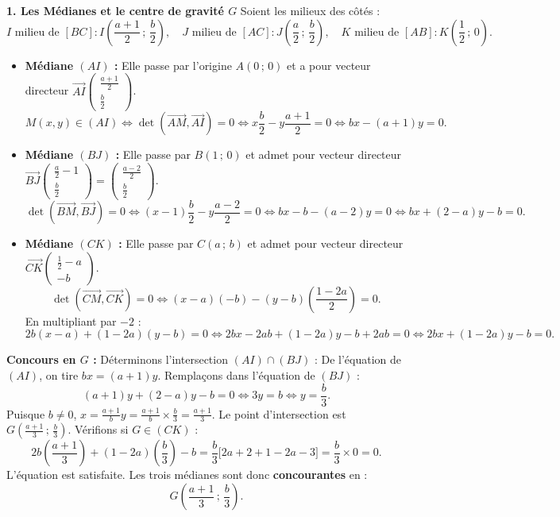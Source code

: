 \documentclass[11pt,a4paper]{article}
\newcommand{\vect}[1]{\overrightarrow{#1}}
\renewcommand{\det}{\operatorname{det}}
\begin{document}
\begin{correctionbox}
\textbf{1. Les Médianes et le centre de gravité $G$}
Soient les milieux des côtés :
\[
I \text{ milieu de } [BC] : I\left(\frac{a + 1}{2} \,;\, \frac{b}{2}\right), \quad
J \text{ milieu de } [AC] : J\left(\frac{a}{2} \,;\, \frac{b}{2}\right), \quad
K \text{ milieu de } [AB] : K\left(\frac{1}{2} \,;\, 0\right).
\]
\begin{itemize}[leftmargin=1cm]
    \item \textbf{Médiane $(AI)$ :} Elle passe par l'origine $A(0\,;\,0)$ et a pour vecteur directeur $\vect{AI}\begin{pmatrix} \frac{a+1}{2} \\ \frac{b}{2} \end{pmatrix}$.
    \[
    M(x, y) \in (AI) \iff \det(\vect{AM}, \vect{AI}) = 0 \iff x \frac{b}{2} - y \frac{a+1}{2} = 0 \iff bx - (a + 1)y = 0.
    \]
    \item \textbf{Médiane $(BJ)$ :} Elle passe par $B(1\,;\,0)$ et admet pour vecteur directeur $\vect{BJ}\begin{pmatrix} \frac{a}{2} - 1 \\ \frac{b}{2} \end{pmatrix} = \begin{pmatrix} \frac{a-2}{2} \\ \frac{b}{2} \end{pmatrix}$.
    \[
    \det(\vect{BM}, \vect{BJ}) = 0 \iff (x - 1)\frac{b}{2} - y \frac{a - 2}{2} = 0 \iff bx - b - (a - 2)y = 0 \iff bx + (2 - a)y - b = 0.
    \]
    \item \textbf{Médiane $(CK)$ :} Elle passe par $C(a\,;\,b)$ et admet pour vecteur directeur $\vect{CK}\begin{pmatrix} \frac{1}{2} - a \\ -b \end{pmatrix}$.
    \[
    \det(\vect{CM}, \vect{CK}) = 0 \iff (x - a)(-b) - (y - b)\left(\frac{1 - 2a}{2}\right) = 0.
    \]
    En multipliant par $-2$ :
    \[
    2b(x - a) + (1 - 2a)(y - b) = 0 \iff 2bx - 2ab + (1 - 2a)y - b + 2ab = 0 \iff 2bx + (1 - 2a)y - b = 0.
    \]
\end{itemize}
\textbf{Concours en $G$ :} Déterminons l'intersection $(AI) \cap (BJ)$ :
De l'équation de $(AI)$, on tire $bx = (a + 1)y$. Remplaçons dans l'équation de $(BJ)$ :
\[
(a + 1)y + (2 - a)y - b = 0 \iff 3y = b \iff y = \frac{b}{3}.
\]
Puisque $b \neq 0$, $x = \frac{a + 1}{b} y = \frac{a + 1}{b} \times \frac{b}{3} = \frac{a + 1}{3}$.
Le point d'intersection est $G\left(\frac{a + 1}{3} \,;\, \frac{b}{3}\right)$.
Vérifions si $G \in (CK)$ :
\[
2b\left(\frac{a + 1}{3}\right) + (1 - 2a)\left(\frac{b}{3}\right) - b = \frac{b}{3}\bigl[ 2a + 2 + 1 - 2a - 3 \bigr] = \frac{b}{3} \times 0 = 0.
\]
L'équation est satisfaite. Les trois médianes sont donc \textbf{concourantes} en :
\[
G\left(\frac{a + 1}{3} \,;\, \frac{b}{3}\right).
\]


\end{correctionbox}
\end{document}
